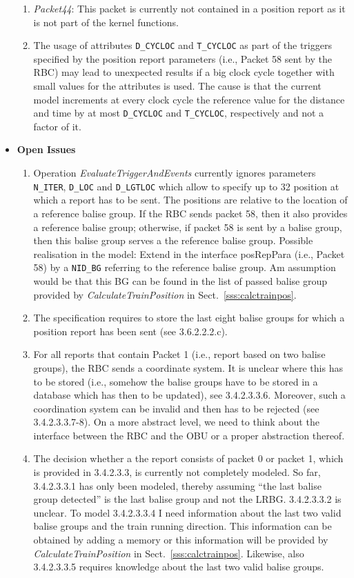 \begin{itemize}
\begin{enumerate}
	\item \textit{Packet44}: This packet is currently not contained in a position report as it is not part of the kernel functions.
	\item The usage of attributes \verb+D_CYCLOC+ and \verb+T_CYCLOC+ as part of the triggers specified by the position report parameters (i.e., Packet 58 sent by the RBC) may lead to unexpected results if a big clock cycle together with small values for the attributes is used. The cause is that the current model increments at every clock cycle the reference value for the distance and time by at most \verb+D_CYCLOC+ and \verb+T_CYCLOC+, respectively and not a factor of it.
\end{enumerate}
\item \textbf{Open Issues}
\begin{enumerate}
	\item Operation \textit{EvaluateTriggerAndEvents} currently ignores parameters \verb+N_ITER+, \verb+D_LOC+ and \verb+D_LGTLOC+ which allow to specify up to 32 position at which a report has to be sent. The positions are relative to the location of a reference balise group. If the RBC sends packet 58, then it also provides a reference balise group; otherwise, if packet 58 is sent by a balise group, then this balise group serves a the reference balise group. Possible realisation in the model: Extend in the interface posRepPara (i.e., Packet 58) by a \verb+NID_BG+ referring to the reference balise group. Am assumption would be that this BG can be found in the list of passed balise group provided by \textit{CalculateTrainPosition} in Sect.~\ref{sss:calctrainpos}.
	\item The specification requires to store the last eight balise groups for which a position report has been sent (see 3.6.2.2.2.c).
	\item For all reports that contain Packet 1 (i.e., report based on two balise groups), the RBC sends a coordinate system. It is unclear where this has to be stored (i.e., somehow the balise groups have to be stored in a database which has then to be updated), see 3.4.2.3.3.6. Moreover, such a coordination system can be invalid and then has to be rejected (see 3.4.2.3.3.7-8). On a more abstract level, we need to think about the interface between the RBC and the OBU or a proper abstraction thereof.
	\item The decision whether a the report consists of packet 0 or packet 1, which is provided in 3.4.2.3.3, is currently not completely modeled. So far, 3.4.2.3.3.1 has only been modeled, thereby assuming ``the last balise group detected'' is the last balise group and not the LRBG. 3.4.2.3.3.2 is unclear. To model 3.4.2.3.3.4 I need information about the last two valid balise groups and the train running direction. This information can be obtained by adding a memory or this information will be provided by \textit{CalculateTrainPosition} in Sect.~\ref{sss:calctrainpos}. Likewise, also 3.4.2.3.3.5 requires knowledge about the last two valid balise groups.
\end{enumerate}
\end{itemize}

